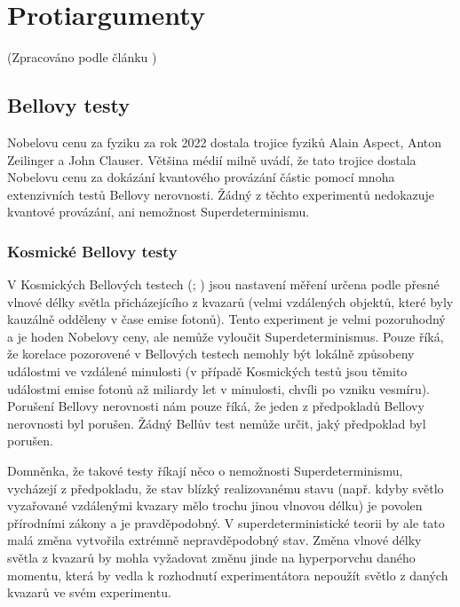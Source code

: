 \section{Protiargumenty}
(Zpracováno podle článku \cite{supdet:rethink})
\subsection{Bellovy testy}


Nobelovu cenu za fyziku za rok 2022 dostala trojice fyziků Alain Aspect, Anton Zeilinger a John Clauser. Většina médií milně uvádí, že tato trojice dostala Nobelovu cenu za dokázání kvantového provázání částic pomocí mnoha extenzivních testů Bellovy nerovnosti. Žádný z těchto experimentů nedokazuje kvantové provázání, ani nemožnost Superdeterminismu.

\subsubsection{Kosmické Bellovy testy}
V Kosmických Bellových testech (\cite{CosBTest:1}; \cite{CosBTest:2}) jsou nastavení měření určena podle přesné vlnové délky světla přicházejícího z kvazarů (velmi vzdálených objektů, které byly kauzálně odděleny v čase emise fotonů). Tento experiment je velmi pozoruhodný a je hoden Nobelovy ceny, ale nemůže vyloučit Superdeterminismus. Pouze říká, že korelace pozorovené v Bellových testech nemohly být lokálně způsobeny událostmi ve vzdálené minulosti (v případě Kosmických testů jsou těmito událostmi emise fotonů až miliardy let v minulosti, chvíli po vzniku vesmíru). Porušení Bellovy nerovnosti nám pouze říká, že jeden z předpokladů Bellovy nerovnosti byl porušen. Žádný Bellův test nemůže určit, jaký předpoklad byl porušen.

Domněnka, že takové testy říkají něco o nemožnosti Superdeterminismu, vycházejí z předpokladu, že stav blízký realizovanému stavu (např. kdyby světlo vyzařované vzdálenými kvazary mělo trochu jinou vlnovou délku) je povolen přírodními zákony a je pravděpodobný. V superdeterministické teorii by ale tato malá změna vytvořila extrémně nepravděpodobný stav. Změna vlnové délky světla z kvazarů by mohla vyžadovat změnu jinde na hyperporvchu daného momentu, která by vedla k rozhodnutí experimentátora nepoužít světlo z daných kvazarů ve svém experimentu.
\clearpage

